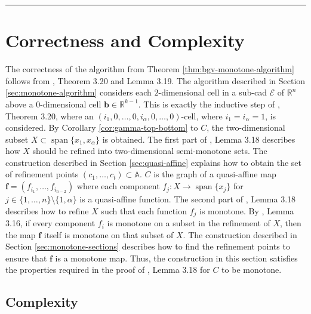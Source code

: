 \documentclass[
]{book}
\theoremstyle{definition}
\theoremstyle{definition}
\theoremstyle{definition}
\theoremstyle{definition}
\theoremstyle{remark}
\begin{document}
\begin{center}\rule{0.5\linewidth}{0.5pt}\end{center}

\hypertarget{correctness-and-complexity-1}{%
\section{Correctness and Complexity}\label{correctness-and-complexity-1}}

The correctness of the algorithm from Theorem \ref{thm:bgv-monotone-algorithm} follows from \citet{bgv15}, Theorem 3.20 and Lemma 3.19.
The algorithm described in Section \ref{sec:monotone-algorithm} considers each \(2\)-dimensional cell in a sub-cad \(\mathcal{E}\) of \(\mathbb{R}^n\) above a \(0\)-dimensional cell \(\mathbf{b} \in \mathbb{R}^{k-1}\). This is exactly the inductive step of \citet{bgv15}, Theorem 3.20, where an \((i_1,0,\ldots,0,i_{\alpha},0,\ldots,0)\)-cell, where \(i_1 = i_\alpha = 1\), is considered.
By Corollary \ref{cor:gamma-top-bottom} to \(C\), the two-dimensional subset \(X \subset {\operatorname{span} \{x_1,x_\alpha\}}\) is obtained. The first part of \citet{bgv15}, Lemma 3.18 describes how \(X\) should be refined into two-dimensional semi-monotone sets. The construction described in Section \ref{sec:quasi-affine} explains how to obtain the set of refinement points \((c_1,\ldots,c_t) \subset \mathbb{A}\).
\(C\) is the graph of a quasi-affine map \(\mathbf{f} = (f_{i_1},\ldots,f_{i_{n-2}})\) where each component \(f_j : X \to {\operatorname{span} \{x_j\}}\) for \(j \in \{1,\ldots,n\} \setminus \{1,\alpha\}\) is a quasi-affine function. The second part of \citet{bgv15}, Lemma 3.18 describes how to refine \(X\) such that each function \(f_j\) is monotone. By \citet{bgv15}, Lemma 3.16, if every component \(f_i\) is monotone on a subset in the refinement of \(X\), then the map \(\mathbf{f}\) itself is monotone on that subset of \(X\).
The construction described in Section \ref{sec:monotone-sections} describes how to find the refinement points to ensure that \(\mathbf{f}\) is a monotone map.
Thus, the construction in this section satisfies the properties required in the proof of \citet{bgv15}, Lemma 3.18 for \(C\) to be monotone.

\hypertarget{complexity-1}{%
\subsection{Complexity}\label{complexity-1}}
\end{document}
